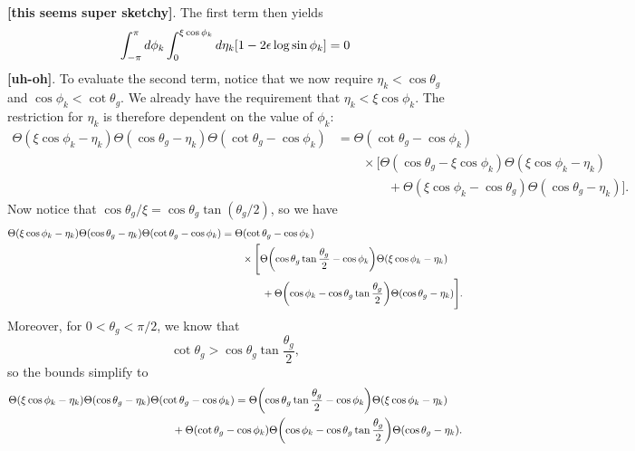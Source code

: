 \documentclass[11pt,twoside,reqno]{amsart}
\theoremstyle{plain}
\theoremstyle{remark}
\theoremstyle{definition}
\theoremstyle{remark}
\theoremstyle{definition}
\theoremstyle{definition}
\begin{document}
	{\color{red}\textbf{[this seems super sketchy]}}. The first term then yields
	\begin{equation}
	\begin{aligned}
		\int_{-\pi}^\pi d\phi_k \int_0^{\xi \cos\phi_k} d\eta_k \qty[1 - 2\epsilon\log\sin\phi_k] = 0
	\end{aligned}
	\end{equation}
	{\color{red}\textbf{[uh-oh]}}. To evaluate the second term, notice that we now require $\eta_k < \cos\theta_g$ and $\cos\phi_k < \cot\theta_g$. We already have the requirement that $\eta_k < \xi\cos\phi_k$. The restriction for $\eta_k$ is therefore dependent on the value of $\phi_k$:
	\begin{equation}
	\begin{aligned}
		\Theta(\xi\cos\phi_k - \eta_k)\Theta(\cos\theta_g - \eta_k)\Theta(\cot\theta_g - \cos\phi_k) &= \Theta(\cot\theta_g - \cos\phi_k)\\
			&\qquad\times [\Theta(\cos\theta_g - \xi\cos\phi_k)\Theta(\xi\cos\phi_k - \eta_k) \\
			&\qquad\qquad+ \Theta(\xi\cos\phi_k - \cos\theta_g)\Theta(\cos\theta_g - \eta_k)].
	\end{aligned}
	\end{equation}
	Now notice that $\cos\theta_g / \xi = \cos\theta_g\tan(\theta_g/2)$, so we have
	\begin{equation}
	\begin{aligned}
		\Theta(\xi\cos\phi_k - \eta_k)\Theta(\cos\theta_g - \eta_k)\Theta(\cot\theta_g - \cos\phi_k) &= \Theta(\cot\theta_g - \cos\phi_k)\\
			&\qquad\times \Bigg[\Theta\qty(\cos\theta_g\tan\frac{\theta_g}{2} - \cos\phi_k)\Theta(\xi\cos\phi_k - \eta_k) \\
			&\qquad\qquad+ \Theta\qty(\cos\phi_k - \cos\theta_g\tan\frac{\theta_g}{2})\Theta(\cos\theta_g - \eta_k)\Bigg].
	\end{aligned}
	\end{equation}
	Moreover, for $0 < \theta_g < \pi/2$, we know that
	\begin{equation}
		\cot\theta_g > \cos\theta_g \tan\frac{\theta_g}{2},
	\end{equation}
	so the bounds simplify to
	\begin{equation}
	\begin{aligned}
		\Theta(\xi\cos\phi_k - \eta_k)\Theta(\cos\theta_g - \eta_k)&\Theta(\cot\theta_g - \cos\phi_k) = \Theta\qty(\cos\theta_g\tan\frac{\theta_g}{2} - \cos\phi_k)\Theta(\xi\cos\phi_k - \eta_k) \\
			&\qquad+ \Theta(\cot\theta_g - \cos\phi_k)\Theta\qty(\cos\phi_k - \cos\theta_g\tan\frac{\theta_g}{2})\Theta(\cos\theta_g - \eta_k).
	\end{aligned}
	\end{equation}
\end{document}
